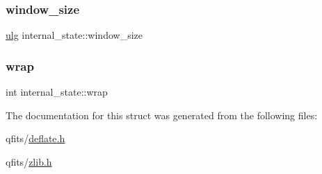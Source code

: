 \mbox{\label{structinternal__state_a4e45f5ef1c4d9d599a5fb11fa283806c}} 
\subsubsection{\texorpdfstring{window\+\_\+size}{window\_size}}
{\footnotesize\ttfamily \hyperlink{zutil_8h_abd6f60bf9450af2ecb94097a32c19a64}{ulg} internal\+\_\+state\+::window\+\_\+size}

\mbox{\label{structinternal__state_ae80327ea7ad4ad0ef5baeef5ef3a6807}} 
\subsubsection{\texorpdfstring{wrap}{wrap}}
{\footnotesize\ttfamily int internal\+\_\+state\+::wrap}



The documentation for this struct was generated from the following files\+:\begin{DoxyCompactItemize}
\item 
qfits/\hyperlink{deflate_8h}{deflate.\+h}\item 
qfits/\hyperlink{zlib_8h}{zlib.\+h}\end{DoxyCompactItemize}
